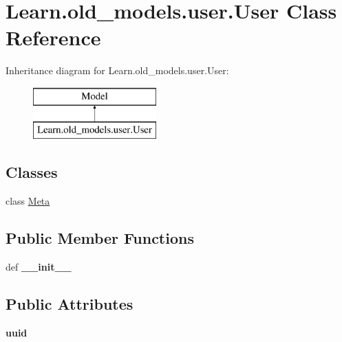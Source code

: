 \hypertarget{class_learn_1_1old__models_1_1user_1_1_user}{\section{Learn.\-old\-\_\-models.\-user.\-User Class Reference}
\label{class_learn_1_1old__models_1_1user_1_1_user}
}
Inheritance diagram for Learn.\-old\-\_\-models.\-user.\-User\-:\begin{figure}[H]
\begin{center}
\leavevmode
\includegraphics[height=2.000000cm]{class_learn_1_1old__models_1_1user_1_1_user}
\end{center}
\end{figure}
\subsection*{Classes}
\begin{DoxyCompactItemize}
\item 
class \hyperlink{class_learn_1_1old__models_1_1user_1_1_user_1_1_meta}{Meta}
\end{DoxyCompactItemize}
\subsection*{Public Member Functions}
\begin{DoxyCompactItemize}
\item 
\hypertarget{class_learn_1_1old__models_1_1user_1_1_user_a09b32112d5beeaec0c0229ca5bc7e126}{def {\bfseries \-\_\-\-\_\-init\-\_\-\-\_\-}}\label{class_learn_1_1old__models_1_1user_1_1_user_a09b32112d5beeaec0c0229ca5bc7e126}

\end{DoxyCompactItemize}
\subsection*{Public Attributes}
\begin{DoxyCompactItemize}
\item 
\hypertarget{class_learn_1_1old__models_1_1user_1_1_user_a894bd93cc2caf7e7a00c180f26863492}{{\bfseries uuid}}\label{class_learn_1_1old__models_1_1user_1_1_user_a894bd93cc2caf7e7a00c180f26863492}

\end{DoxyCompactItemize}
